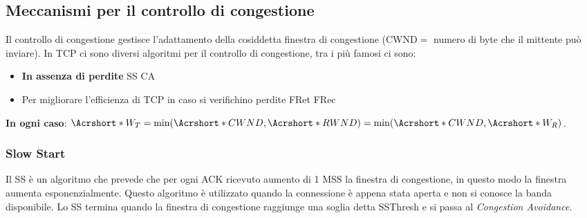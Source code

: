     \subsection{Meccanismi per il controllo di congestione}
        Il controllo di congestione gestisce l'adattamento della cosiddetta finestra di congestione (\Acrshort*{CWND}$=$ numero di byte che il mittente può inviare). \newline
        In \Acrshort*{TCP} ci sono diversi algoritmi per il controllo di congestione, tra i più famosi ci sono: \begin{itemize}
            \item \textbf{In assenza di perdite}
                \subitem \Acrlong*{SS}
                \subitem \Acrlong*{CA}
            \item Per migliorare l'efficienza di \Acrshort*{TCP} in caso si verifichino perdite
                \subitem \Acrlong*{FRet}
                \subitem \Acrlong*{FRec}
        \end{itemize}
        \textbf{In ogni caso}: $\Acrshort*{W_T} = \min(\Acrshort*{CWND}, \Acrshort*{RWND}) = \min(\Acrshort*{CWND}, \Acrshort*{W_R}) $.
        \subsubsection{Slow Start}
            Il \Acrlong*{SS} è un algoritmo che prevede che per ogni \Acrshort*{ACK} ricevuto aumento di 1 \Acrshort*{MSS} la finestra di congestione, in questo modo la finestra aumenta esponenzialmente. Questo algoritmo è utilizzato quando la connessione è appena stata aperta e non si conosce la banda disponibile. Lo \Acrlong*{SS} termina quando la finestra di congestione raggiunge una soglia detta \Acrfull*{SSThresh} e si passa al \textit{Congestion Avoidance}.
